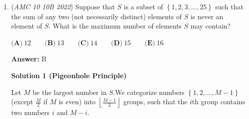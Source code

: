 \begin{enumerate}
 $(x^2-2xy+y^2)=15553-3xy$
$(x-y)^2=15553-3xy$
$4=15553-3xy$
$3xy=15549$
$xy=5183$.

 We write out the factors of $5183$ and find $71$ and $73$.

 We can then list out primes greater than $73$ to find $79$, which has a digit sum of $\boxed{16}$.

 



\textbf{Solution 7 (similar to Solution 2, but with a square root algorithm)}

Proceed as in Solution 1 to get

 $6b^2+12b=31098$

 Divide out by 6 and add 1:

 $b^2+2b+1=(b+1)^2=5184$

 There is a shortcut to compute square roots of 4-digit numbers, but only if the number is a perfect square. Since the problem must have an integer answer, 5184 must be a perfect square. The shortcut is:

 1) Find all one-digit numbers whose squares end in 4, the last digit of 5184. $2^2=4$ and $8^2=64$, so the numbers are 2 and 8.

 2) Find the largest one-digit number whose square is under the number formed by the first two digits, here 51. This number is 7, as $7^2=49$. This is the tens digit of the answer

 3) Multiply 7 by the number after it. If the product is greater than 51, then the units digit is 2, otherwise, the units digit is 8. Since $7\cdot8=56>51$, $b+1=72$, thus, $a=73$ and $b=71$.

 The least prime greater than $a$ is 79, which has a digit sum of $\boxed{16}$.

 


	\item (\textit{AMC 10 10B 2022}) Suppose that $S$ is a subset of $\left\{ 1, 2, 3, \ldots , 25 \right\}$ such that the sum of any two (not necessarily distinct) elements of $S$ is never an element of $S.$ What is the maximum number of elements $S$ may contain?


 $\textbf{(A)}\ 12 \qquad\textbf{(B)}\ 13 \qquad\textbf{(C)}\ 14 \qquad\textbf{(D)}\ 15 \qquad\textbf{(E)}\ 16$

 \textbf{Answer: }B



\textbf{Solution 1 (Pigeonhole Principle)}

Let $M$ be the largest number in $S$.We categorize numbers $\left\{ 1, 2, \ldots , M-1 \right\}$ (except $\frac{M}{2}$ if $M$ is even) into $\left\lfloor \frac{M-1}{2} \right\rfloor$ groups, such that the $i$th group contains two numbers $i$ and $M-i$.


\end{enumerate}
